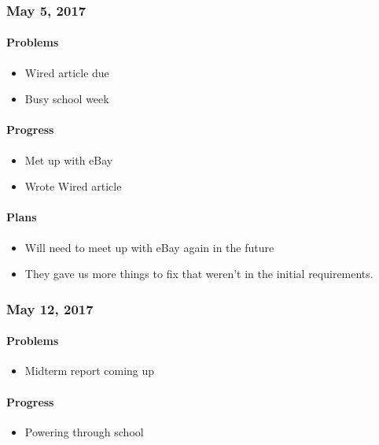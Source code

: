 \subsubsection{May 5, 2017}\label{section}
\paragraph{Problems}\label{problems}
\begin{itemize}
\tightlist
\item
  Wired article due
\item
  Busy school week
\end{itemize}
\paragraph{Progress}\label{progress}
\begin{itemize}
\tightlist
\item
  Met up with eBay
\item
  Wrote Wired article
\end{itemize}
\paragraph{Plans}\label{plans}
\begin{itemize}
\tightlist
\item
  Will need to meet up with eBay again in the future
\item
  They gave us more things to fix that weren't in the initial
  requirements.
\end{itemize}

\subsubsection{May 12, 2017}\label{section}
\paragraph{Problems}\label{problems}
\begin{itemize}
\tightlist
\item
  Midterm report coming up
\end{itemize}
\paragraph{Progress}\label{progress}
\begin{itemize}
\tightlist
\item
  Powering through school
\end{itemize}
